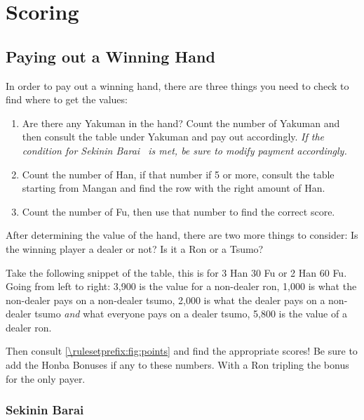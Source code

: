 \section{Scoring}\label{core:sec:scoring}

\subsection{Paying out a Winning Hand}\label{core:ssec:paying-hand}

In order to pay out a winning hand, there are three things you need to check to find where to get the values:
\begin{enumerate}
	\item Are there any Yakuman in the hand? Count the number of Yakuman and then consult the table under Yakuman and pay out accordingly.
	\textit{\small If the condition for Sekinin Barai~ is met, be sure to modify payment accordingly.}
	\item Count the number of Han, if that number if 5 or more, consult the table starting from Mangan and find the row with the right amount of Han.
	\item Count the number of Fu, then use that number to find the correct score.
\end{enumerate}

After determining the value of the hand, there are two more things to consider: Is the winning player a dealer or not? Is it a Ron or a Tsumo?

Take the following snippet of the table, this is for 3 Han 30 Fu or 2 Han 60 Fu. Going from left to right: 3,900 is the value for a non-dealer ron, 1,000 is what the non-dealer pays on a non-dealer tsumo, 2,000 is what the dealer pays on a non-dealer tsumo \textit{and} what everyone pays on a dealer tsumo, 5,800 is the value of a dealer ron.



Then consult \autoref{\rulesetprefix:fig:points} and find the appropriate scores! Be sure to add the Honba Bonuses  if any to these numbers. With a Ron tripling the bonus for the only payer.

\subsubsection{Sekinin Barai}\label{core:sssec:sekinin-barai}

